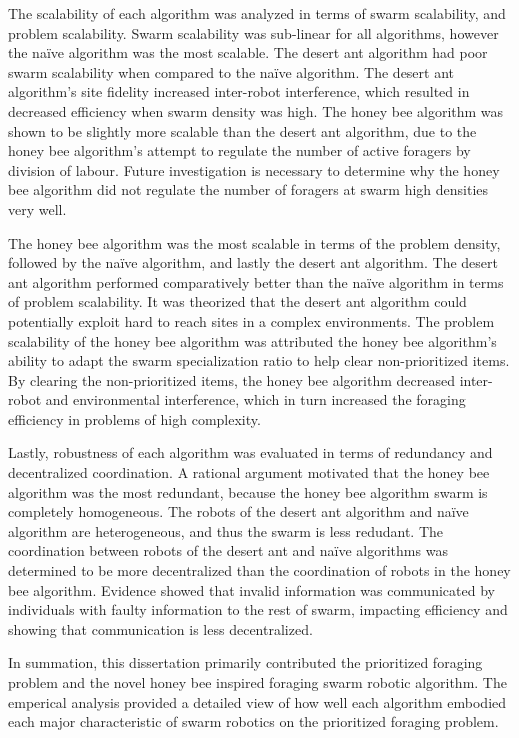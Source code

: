 The scalability of each algorithm was analyzed in terms of swarm scalability, and problem scalability. Swarm scalability was sub-linear for all algorithms, however the na\"ive algorithm was the most scalable. The desert ant algorithm had poor swarm scalability when compared to the na\"ive algorithm. The desert ant algorithm's site fidelity increased inter-robot interference, which resulted in decreased efficiency when swarm density was high. The honey bee algorithm was shown to be slightly more scalable than the desert ant algorithm, due to the honey bee algorithm's attempt to regulate the number of active foragers by division of labour. Future investigation is necessary to determine why the honey bee algorithm did not regulate the number of foragers at swarm high densities very well. 

The honey bee algorithm was the most scalable in terms of the problem density, followed by the na\"ive algorithm, and lastly the desert ant algorithm. The desert ant algorithm performed comparatively better than the na\"ive algorithm in terms of problem scalability. It was theorized that the desert ant algorithm could potentially exploit hard to reach sites in a complex environments. The problem scalability of the honey bee algorithm was attributed the honey bee algorithm's ability to adapt the swarm specialization ratio to help clear non-prioritized items. By clearing the non-prioritized items, the honey bee algorithm decreased inter-robot and environmental interference, which in turn increased the foraging efficiency in problems of high complexity.

Lastly, robustness of each algorithm was evaluated in terms of redundancy and decentralized coordination. A rational argument  motivated that the honey bee algorithm was the most redundant, because the honey bee algorithm swarm is completely homogeneous. The robots of the desert ant algorithm and na\"ive algorithm are heterogeneous, and thus the swarm is less redudant. The coordination between robots of the desert ant and na\"ive algorithms was determined to be more decentralized than the coordination of robots in the honey bee algorithm. Evidence showed that invalid information was communicated by  individuals with faulty information to the rest of swarm, impacting efficiency and showing that communication is less decentralized.

In summation, this dissertation primarily contributed the prioritized foraging problem and the novel honey bee inspired foraging swarm robotic algorithm. The emperical analysis provided a detailed view of how well each algorithm embodied each major characteristic of swarm robotics on the prioritized foraging problem.

